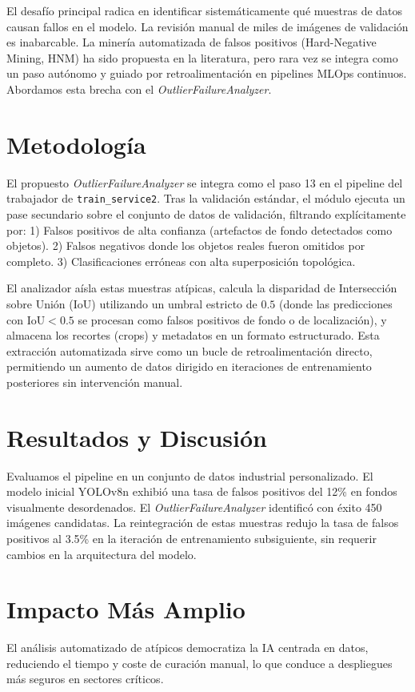 \documentclass[conference]{IEEEtran}
\begin{document}
El desafío principal radica en identificar sistemáticamente qué muestras de datos causan fallos en el modelo. La revisión manual de miles de imágenes de validación es inabarcable. La minería automatizada de falsos positivos (Hard-Negative Mining, HNM) ha sido propuesta en la literatura, pero rara vez se integra como un paso autónomo y guiado por retroalimentación en pipelines MLOps continuos. Abordamos esta brecha con el \textit{OutlierFailureAnalyzer}.

\section{Metodología}
El propuesto \textit{OutlierFailureAnalyzer} se integra como el paso 13 en el pipeline del trabajador de \texttt{train\_service2}. Tras la validación estándar, el módulo ejecuta un pase secundario sobre el conjunto de datos de validación, filtrando explícitamente por:
1) Falsos positivos de alta confianza (artefactos de fondo detectados como objetos).
2) Falsos negativos donde los objetos reales fueron omitidos por completo.
3) Clasificaciones erróneas con alta superposición topológica.

El analizador aísla estas muestras atípicas, calcula la disparidad de Intersección sobre Unión (IoU) utilizando un umbral estricto de $0.5$ (donde las predicciones con $\text{IoU} < 0.5$ se procesan como falsos positivos de fondo o de localización), y almacena los recortes (crops) y metadatos en un formato estructurado. Esta extracción automatizada sirve como un bucle de retroalimentación directo, permitiendo un aumento de datos dirigido en iteraciones de entrenamiento posteriores sin intervención manual.

\section{Resultados y Discusión}
Evaluamos el pipeline en un conjunto de datos industrial personalizado. El modelo inicial YOLOv8n exhibió una tasa de falsos positivos del 12\% en fondos visualmente desordenados. El \textit{OutlierFailureAnalyzer} identificó con éxito 450 imágenes candidatas. La reintegración de estas muestras redujo la tasa de falsos positivos al 3.5\% en la iteración de entrenamiento subsiguiente, sin requerir cambios en la arquitectura del modelo.

\section{Impacto Más Amplio}
El análisis automatizado de atípicos democratiza la IA centrada en datos, reduciendo el tiempo y coste de curación manual, lo que conduce a despliegues más seguros en sectores críticos.



\end{document}
